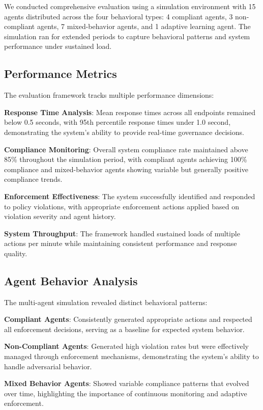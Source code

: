 \documentclass[letterpaper]{article}
\begin{document}
We conducted comprehensive evaluation using a simulation environment with 15 agents distributed across the four behavioral types: 4 compliant agents, 3 non-compliant agents, 7 mixed-behavior agents, and 1 adaptive learning agent. The simulation ran for extended periods to capture behavioral patterns and system performance under sustained load.

\subsection{Performance Metrics}

The evaluation framework tracks multiple performance dimensions:

\textbf{Response Time Analysis}: Mean response times across all endpoints remained below 0.5 seconds, with 95th percentile response times under 1.0 second, demonstrating the system's ability to provide real-time governance decisions.

\textbf{Compliance Monitoring}: Overall system compliance rate maintained above 85\% throughout the simulation period, with compliant agents achieving 100\% compliance and mixed-behavior agents showing variable but generally positive compliance trends.

\textbf{Enforcement Effectiveness}: The system successfully identified and responded to policy violations, with appropriate enforcement actions applied based on violation severity and agent history.

\textbf{System Throughput}: The framework handled sustained loads of multiple actions per minute while maintaining consistent performance and response quality.

\subsection{Agent Behavior Analysis}

The multi-agent simulation revealed distinct behavioral patterns:

\textbf{Compliant Agents}: Consistently generated appropriate actions and respected all enforcement decisions, serving as a baseline for expected system behavior.

\textbf{Non-Compliant Agents}: Generated high violation rates but were effectively managed through enforcement mechanisms, demonstrating the system's ability to handle adversarial behavior.

\textbf{Mixed Behavior Agents}: Showed variable compliance patterns that evolved over time, highlighting the importance of continuous monitoring and adaptive enforcement.
\end{document}

